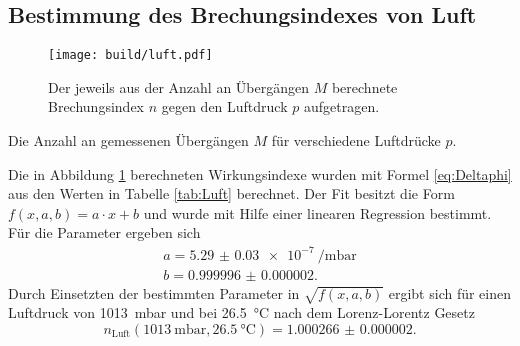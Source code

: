 \subsection{Bestimmung des Brechungsindexes von Luft}
\label{ssec:luft}
\begin{figure}
	\centering
	\texttt{[image: build/luft.pdf]}
	\caption{Der jeweils aus der Anzahl an Übergängen $M$ berechnete Brechungsindex $n$ gegen den Luftdruck $p$ aufgetragen.}
	\label{fig:Luft}
\end{figure}
\begin{table}
	\centering
	\caption{Die Anzahl an gemessenen Übergängen $M$ für verschiedene Luftdrücke $p$.}
	
\end{table}
Die in Abbildung \ref{fig:Luft} berechneten Wirkungsindexe wurden mit Formel \eqref{eq:Deltaphi} aus den Werten in Tabelle \ref{tab:Luft} berechnet. Der Fit besitzt die Form $f(x,a,b) =a\cdot x +b$ und wurde mit Hilfe einer linearen Regression bestimmt. Für die Parameter ergeben sich
\begin{gather*}
	a=\SI{5.29(3)e-7}{\per\milli\bar}\\
	b=\num{0.999996(2)}.
\end{gather*}
Durch Einsetzten der bestimmten Parameter in $\sqrt{f(x,a,b)}$ ergibt sich für einen Luftdruck von \SI{1013}{\milli\bar} und bei \SI{26.5}{\degreeCelsius} nach dem Lorenz-Lorentz Gesetz
\begin{displaymath}
 n_\text{Luft}(\SI{1013}{\milli\bar},\SI{26.5}{\degreeCelsius})=\num{1.000266(2)}.
\end{displaymath}